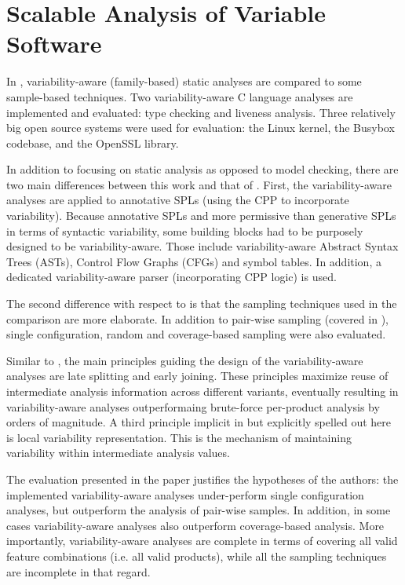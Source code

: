 \documentclass[11pt]{article}
\begin{document}
\section{Scalable Analysis of Variable Software}
In \cite{Liebig:2013}, variability-aware (family-based) static analyses are compared to some sample-based techniques. Two variability-aware C language analyses are implemented and evaluated: type checking and liveness analysis. Three relatively big open source systems were used for evaluation: the Linux kernel, the Busybox codebase, and the OpenSSL library.

In addition to focusing on static analysis as opposed to model checking, there are two main differences between this work and that of \cite{Apel:2013}. First, the variability-aware analyses are applied to annotative SPLs (using the CPP to incorporate variability). Because annotative SPLs and more permissive than generative SPLs in terms of syntactic variability, some building blocks had to be purposely designed to be variability-aware. Those include variability-aware Abstract Syntax Trees (ASTs), Control Flow Graphs (CFGs) and symbol tables. In addition, a dedicated variability-aware parser (incorporating CPP logic) is used.

The second difference with respect to \cite{Apel:2013} is that the sampling techniques used in the comparison are more elaborate. In addition to pair-wise sampling (covered in \cite{Apel:2013}), single configuration, random and coverage-based sampling were also evaluated.

Similar to \cite{Apel:2013}, the main principles guiding the design of the variability-aware analyses are late splitting and early joining. These principles maximize reuse of intermediate analysis information across different variants, eventually resulting in variability-aware analyses outperformaing brute-force per-product analysis by orders of magnitude. A third principle implicit in \cite{Apel:2013} but explicitly spelled out here is local variability representation. This is the mechanism of maintaining variability within intermediate analysis values.

The evaluation presented in the paper justifies the hypotheses of the authors: the implemented variability-aware analyses under-perform single configuration analyses, but outperform the analysis of pair-wise samples. In addition, in some cases variability-aware analyses also outperform coverage-based analysis. More importantly, variability-aware analyses are complete in terms of covering all valid feature combinations (i.e. all valid products), while all the sampling techniques are incomplete in that regard.
\end{document}
